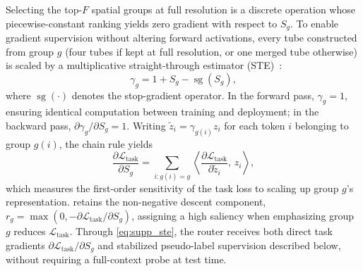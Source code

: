     Selecting the top-$F$ spatial groups at full resolution is a discrete operation whose piecewise-constant ranking yields zero gradient with respect to $S_g$.
    To enable gradient supervision without altering forward activations, every tube constructed from group $g$ (four tubes if kept at full resolution, or one merged tube otherwise) is scaled by a multiplicative straight-through estimator (STE)~\cite{bengio2013estimating}:
    \begin{equation}
        \gamma_g = 1 + S_g - \operatorname{sg}(S_g),
        \label{eq:supp_ste}
    \end{equation}
    where $\operatorname{sg}(\cdot)$ denotes the stop-gradient operator.
    In the forward pass, $\gamma_g = 1$, ensuring identical computation between training and deployment; in the backward pass, $\partial \gamma_g / \partial S_g = 1$.
    Writing $\tilde{z}_i = \gamma_{g(i)} z_i$ for each token $i$ belonging to group $g(i)$, the chain rule yields
    \begin{equation}
        \frac{\partial \mathcal{L}_{\text{task}}}{\partial S_g} = \sum_{i : g(i) = g} \left\langle \frac{\partial \mathcal{L}_{\text{task}}}{\partial \tilde{z}_i},\, z_i \right\rangle,
        \label{eq:supp_chain}
    \end{equation}
    which measures the first-order sensitivity of the task loss to scaling up group $g$'s representation.
     retains the non-negative descent component, $r_g = \max(0, -\partial \mathcal{L}_{\text{task}} / \partial S_g)$, assigning a high saliency when emphasizing group $g$ reduces $\mathcal{L}_{\text{task}}$.
    Through \cref{eq:supp_ste}, the router receives both direct task gradients $\partial \mathcal{L}_{\text{task}} / \partial S_g$ and stabilized pseudo-label supervision described below, without requiring a full-context probe at test time.


